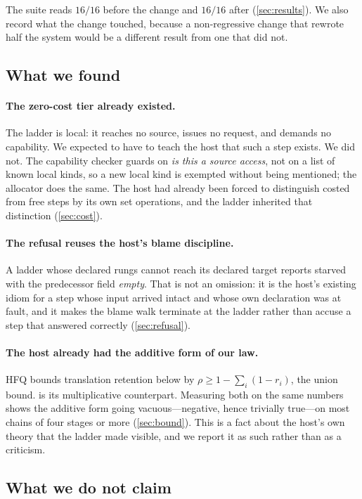 \documentclass[11pt,twocolumn,a4paper]{article}
\theoremstyle{plain}
\theoremstyle{definition}
\theoremstyle{remark}
\newcommand{\vstarve}{\textsf{starved}}
\begin{document}
The suite reads $16/16$ before the change and $16/16$ after
(\cref{sec:results}). We also record what the change touched, because a
non-regressive change that rewrote half the system would be a different result
from one that did not.

\subsection{What we found}

\paragraph{The zero-cost tier already existed.} The ladder is local: it reaches
no source, issues no request, and demands no capability. We expected to have to
teach the host that such a step exists. We did not. The capability checker
guards on \emph{is this a source access}, not on a list of known local kinds,
so a new local kind is exempted without being mentioned; the allocator does the
same. The host had already been forced to distinguish costed from free steps by
its own set operations, and the ladder inherited that distinction
(\cref{sec:cost}).

\paragraph{The refusal reuses the host's blame discipline.} A ladder whose
declared rungs cannot reach its declared target reports \vstarve{} with the
predecessor field \emph{empty}. That is not an omission: it is the host's
existing idiom for a step whose input arrived intact and whose own declaration
was at fault, and it makes the blame walk terminate at the ladder rather than
accuse a step that answered correctly (\cref{sec:refusal}).

\paragraph{The host already had the additive form of our law.} HFQ bounds
translation retention below by $\rho\ge1-\sum_i(1-r_i)$, the union bound.
 is its multiplicative counterpart. Measuring both on the same
numbers shows the additive form going vacuous---negative, hence trivially
true---on most chains of four stages or more (\cref{sec:bound}). This is a fact
about the host's own theory that the ladder made visible, and we report it as
such rather than as a criticism.

\subsection{What we do not claim}
\end{document}
